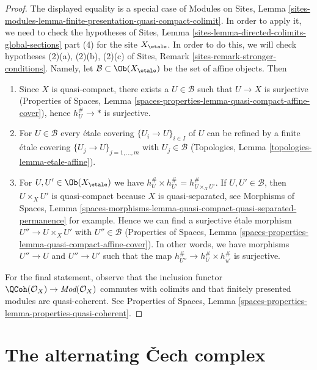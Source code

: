 \begin{proof}
The displayed equality is a special case of Modules on Sites, Lemma
\ref{sites-modules-lemma-finite-presentation-quasi-compact-colimit}.
In order to apply it, we need to check the hypotheses of
Sites, Lemma \ref{sites-lemma-directed-colimits-global-sections} part (4)
for the site $X_\etale$.
In order to do this, we will check hypotheses
(2)(a), (2)(b), (2)(c) of
Sites, Remark \ref{sites-remark-stronger-conditions}.
Namely, let $\mathcal{B} \subset \Ob(X_\etale)$ be the set of affine objects.
Then
\begin{enumerate}
\item Since $X$ is quasi-compact, there exists a $U \in \mathcal{B}$
such that $U \to X$ is surjective
(Properties of Spaces, Lemma
\ref{spaces-properties-lemma-quasi-compact-affine-cover}),
hence $h_U^\# \to *$ is surjective.
\item For $U \in \mathcal{B}$ every \'etale covering $\{U_i \to U\}_{i \in I}$
of $U$ can be refined by a finite \'etale covering
$\{U_j \to U\}_{j = 1, \ldots, m}$ with $U_j \in \mathcal{B}$
(Topologies, Lemma \ref{topologies-lemma-etale-affine}).
\item For $U, U' \in \Ob(X_\etale)$ we have
$h_U^\# \times h_{U'}^\# = h_{U \times_X U'}^\#$.
If $U, U' \in \mathcal{B}$, then $U \times_X U'$ is quasi-compact
because $X$ is quasi-separated, see Morphisms of Spaces, Lemma
\ref{spaces-morphisms-lemma-quasi-compact-quasi-separated-permanence}
for example. Hence we can find a surjective \'etale morphism
$U'' \to U \times_X U'$ with $U'' \in \mathcal{B}$
(Properties of Spaces, Lemma
\ref{spaces-properties-lemma-quasi-compact-affine-cover}).
In other words, we have morphisms $U'' \to U$ and $U'' \to U'$
such that the map $h_{U''}^\# \to h_U^\# \times h_{u'}^\#$ is
surjective.
\end{enumerate}
For the final statement, observe that the inclusion functor
$\QCoh(\mathcal{O}_X) \to \textit{Mod}(\mathcal{O}_X)$
commutes with colimits and that finitely presented modules
are quasi-coherent. See
Properties of Spaces, Lemma
\ref{spaces-properties-lemma-properties-quasi-coherent}.
\end{proof}





\section{The alternating {\v C}ech complex}
\label{section-alternating-cech}

